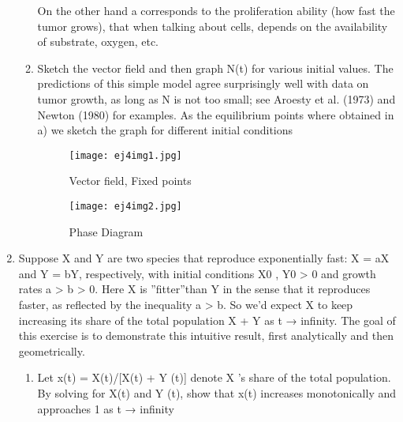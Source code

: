 \documentclass[a4paper,10pt]{article}
\begin{document}
\begin{enumerate}
\begin{enumerate}
\begin{equation}
                \end{equation}
                On the other hand a corresponds to the proliferation ability (how fast the tumor grows), that when talking about cells, depends on the availability of substrate, oxygen, etc.
        \item  
            Sketch the vector field and then graph N(t) for various initial values. The predictions of this simple model agree surprisingly well with data on tumor growth, as long as N is not too small; see Aroesty et al. (1973) and Newton (1980) for examples.
            As the equilibrium points where obtained in a) we sketch the graph for different initial conditions
            \begin{figure}[h]
                \centering
                \texttt{[image: ej4img1.jpg]}
                \caption{Vector field, Fixed points}
                \label{fig:mesh1}
            \end{figure}
            \begin{figure}[h]
                \centering
                \texttt{[image: ej4img2.jpg]}
                \caption{Phase Diagram}
                \label{fig:mesh1}
            \end{figure}
    \end{enumerate}
    
    \newpage
    \item Suppose X and Y are two species that reproduce exponentially fast: X = aX and Y = bY, respectively, with initial conditions X0 , Y0 > 0 and growth rates a > b > 0. Here X is ”fitter”than Y in the sense that it reproduces faster, as reflected by the inequality a > b. So we’d expect X to keep increasing its share of the total population X + Y as t → infinity. The goal of this exercise is to demonstrate this intuitive result, first analytically and then geometrically.
    \begin{enumerate}
        \item  Let x(t) = X(t)/[X(t) + Y (t)] denote X ’s share of the total population. By solving for X(t) and Y (t), show that x(t) increases monotonically and approaches 1 as t → infinity
        

\end{enumerate}
\end{enumerate}
\end{document}
